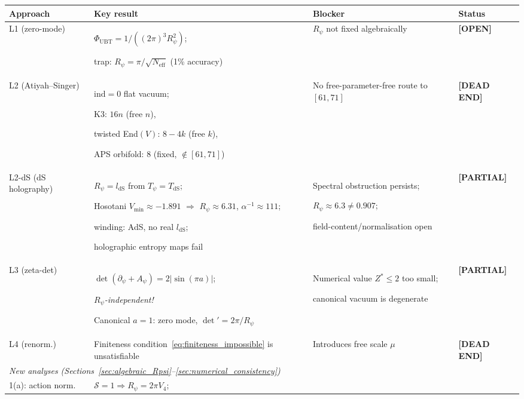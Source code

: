 \documentclass[11pt,a4paper]{article}
\theoremstyle{definition}
\theoremstyle{remark}
\begin{document}
\begin{center}
\begin{tabular}{lp{4.8cm}p{3.6cm}l}
  \toprule
  Approach & Key result & Blocker & Status \\
  \midrule
  L1 (zero-mode)
    & $\Phi_{\mathrm{UBT}} = 1/((2\pi)^3 R_\psi^2)$;\par
      trap: $R_\psi = \pi/\sqrt{N_{\mathrm{eff}}}$ (1\% accuracy)
    & $R_\psi$ not fixed algebraically
    & \textbf{[OPEN]} \\[6pt]
  L2 (Atiyah--Singer)
    & $\mathrm{ind}=0$ flat vacuum;\par
      K3: $16n$ (free $n$),\par
      twisted End$(V)$: $8{-}4k$ (free $k$),\par
      APS orbifold: $8$ (fixed, $\notin[61,71]$)
    & No free-parameter-free route to $[61,71]$
    & \textbf{[DEAD END]} \\[6pt]
  L2-dS (dS holography)
    & $R_\psi = l_{\mathrm{dS}}$ from $T_\psi = T_{\mathrm{dS}}$;\par
      Hosotani $V_{\min}\!\approx\!{-1.891}$
      $\Rightarrow$ $R_\psi\!\approx\!6.31$,
      $\alpha^{-1}\!\approx\!111$;\par
      winding: AdS, no real $l_{\mathrm{dS}}$;\par
      holographic entropy maps fail
    & Spectral obstruction persists;\par
      $R_\psi \approx 6.3 \neq 0.907$;\par
      field-content/normalisation open
    & \textbf{[PARTIAL]} \\[6pt]
  L3 (zeta-det)
    & $\det(\partial_\psi+A_\psi) = 2|\sin(\pi a)|$;\par
      \emph{$R_\psi$-independent!}\par
      Canonical $a=1$: zero mode, $\det'=2\pi/R_\psi$
    & Numerical value $Z^*\leq 2$ too small;\par
      canonical vacuum is degenerate
    & \textbf{[PARTIAL]} \\[6pt]
  L4 (renorm.)
    & Finiteness condition~\eqref{eq:finiteness_impossible}
      is unsatisfiable
    & Introduces free scale $\mu$
    & \textbf{[DEAD END]} \\[6pt]
  \midrule
  \multicolumn{4}{l}{\textit{New analyses (Sections~\ref{sec:algebraic_Rpsi}--\ref{sec:numerical_consistency})}} \\[3pt]
  1(a): action norm.
    & $\mathcal{S}=1 \Rightarrow R_\psi = 2\pi V_4$;\par

\end{tabular}
\end{center}
\end{document}
